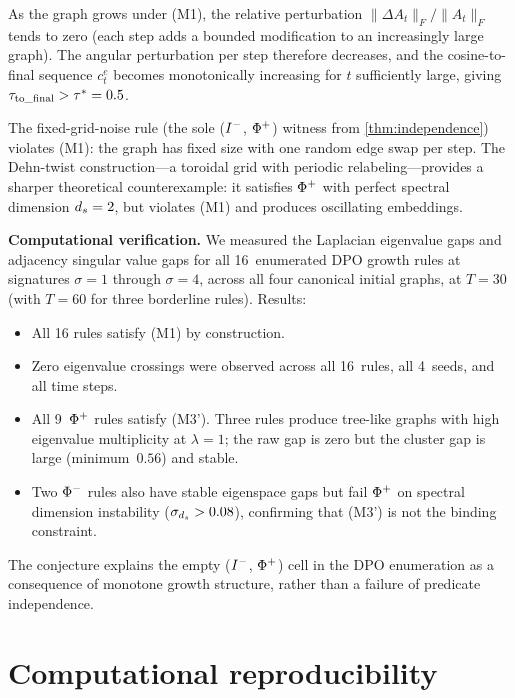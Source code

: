 \documentclass{../shared/primo}
\begin{document}
As the graph grows under (M1), the relative perturbation $\|\Delta A_t\|_F / \|A_t\|_F$ tends to zero (each step adds a bounded modification to an increasingly large graph). The angular perturbation per step therefore decreases, and the cosine-to-final sequence $c_t^e$ becomes monotonically increasing for $t$ sufficiently large, giving $\tau_{\mathrm{to\_final}} > \tau^* = 0.5$.

\begin{remark}
The fixed-grid-noise rule (the sole ($I\textsuperscript{$-$}$, $\Phi\textsuperscript{+}$) witness from \cref{thm:independence}) violates (M1): the graph has fixed size with one random edge swap per step. The Dehn-twist construction---a toroidal grid with periodic relabeling---provides a sharper theoretical counterexample: it satisfies $\Phi\textsuperscript{+}$ with perfect spectral dimension $d_s = 2$, but violates (M1) and produces oscillating embeddings.
\end{remark}

\textbf{Computational verification.} We measured the Laplacian eigenvalue gaps and adjacency singular value gaps for all 16~enumerated DPO growth rules at signatures $\sigma = 1$ through $\sigma = 4$, across all four canonical initial graphs, at $T = 30$ (with $T = 60$ for three borderline rules). Results:

\begin{itemize}
\item All 16 rules satisfy (M1) by construction.
\item Zero eigenvalue crossings were observed across all 16~rules, all 4~seeds, and all time steps.
\item All 9~$\Phi\textsuperscript{+}$ rules satisfy (M3'). Three rules produce tree-like graphs with high eigenvalue multiplicity at $\lambda = 1$; the raw gap is zero but the cluster gap is large (minimum~$0.56$) and stable.
\item Two $\Phi\textsuperscript{$-$}$ rules also have stable eigenspace gaps but fail $\Phi\textsuperscript{+}$ on spectral dimension instability ($\sigma_{d_s} > 0.08$), confirming that (M3') is not the binding constraint.
\end{itemize}

The conjecture explains the empty ($I\textsuperscript{$-$}$, $\Phi\textsuperscript{+}$) cell in the DPO enumeration as a consequence of monotone growth structure, rather than a failure of predicate independence.


\appendix

\section{Computational reproducibility}
\label{app:reproducibility}
\end{document}
